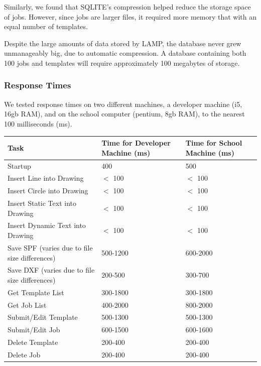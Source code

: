 \documentclass[oneside,openany,11pt,a4paper]{report}
\begin{document}
Similarly, we found that SQLITE's compression helped reduce the storage space of jobs. However, since jobs are larger files, it required more memory that with an equal number of templates.


Despite the large amounts of data stored by LAMP, the database never grew unmanageably big, due to automatic compression. A database containing both 100 jobs and templates will require approximately 100 megabytes of storage.

\subsubsection{Response Times}
We tested response times on two different machines, a developer machine (i5, 16gb RAM), and on the school computer (pentium, 8gb RAM), to the nearest 100 milliseconds (ms).
\begin{longtable}{|p{7cm}|p{3cm}|p{3cm}|}
	\hline
	\rowcolor{gray!50}
	\textbf{Task} & \textbf{Time for Developer Machine (ms)} &  \textbf{Time for School Machine (ms)}  \\ \hline
	Startup & 400 & 500  \\ \hline

	Insert Line into Drawing & $<$ 100 & $<$ 100  \\ \hline
	Insert Circle into Drawing & $<$ 100 & $<$ 100  \\ \hline
	Insert Static Text into Drawing & $<$ 100 & $<$ 100  \\ \hline
	Insert Dynamic Text into Drawing & $<$ 100 & $<$ 100  \\ \hline
	
	Save SPF (varies due to file size differences) & 500-1200 & 600-2000  \\ \hline
	Save DXF (varies due to file size differences) & 200-500 & 300-700 \\ \hline
	
	Get Template List & 300-1800 & 300-1800  \\ \hline
	Get Job List & 400-2000 & 800-2000  \\ \hline

	Submit/Edit Template & 500-1300 & 500-1300 \\ \hline
	Submit/Edit Job & 600-1500 & 600-1600  \\ \hline
	
	Delete Template & 200-400 & 200-400 \\ \hline
	Delete Job & 200-400 & 200-400  \\ \hline
\end{longtable}
\end{document}
